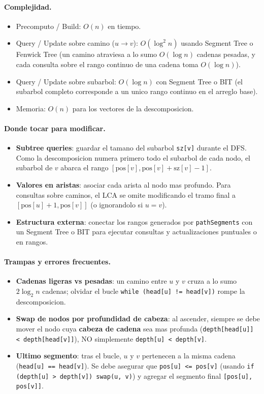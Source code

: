 \paragraph{Complejidad.}
\begin{itemize}\setlength\itemsep{0pt}
	\item Precomputo / Build: $O(n)$ en tiempo.
	\item Query / Update sobre camino ($u \to v$): $O(\log^2 n)$ usando Segment Tree o Fenwick Tree (un camino atraviesa a lo sumo $O(\log n)$ cadenas pesadas, y cada consulta sobre el rango continuo de una cadena toma $O(\log n)$).
	\item Query / Update sobre subarbol: $O(\log n)$ con Segment Tree o BIT (el subarbol completo corresponde a un unico rango continuo en el arreglo base).
	\item Memoria: $O(n)$ para los vectores de la descomposicion.
\end{itemize}

\paragraph{Donde tocar para modificar.}
\begin{itemize}\setlength\itemsep{0pt}
	\item \textbf{Subtree queries}: guardar el tamano del subarbol \verb|sz[v]| durante el DFS. Como la descomposicion numera primero todo el subarbol de cada nodo, el subarbol de $v$ abarca el rango $[\text{pos}[v], \text{pos}[v] + \text{sz}[v] - 1]$.
	\item \textbf{Valores en aristas}: asociar cada arista al nodo mas profundo. Para consultas sobre caminos, el LCA se omite modificando el tramo final a $[\text{pos}[u] + 1, \text{pos}[v]]$ (o ignorandolo si $u = v$).
	\item \textbf{Estructura externa}: conectar los rangos generados por \verb|pathSegments| con un Segment Tree o BIT para ejecutar consultas y actualizaciones puntuales o en rangos.
\end{itemize}

\paragraph{Trampas y errores frecuentes.}
\begin{itemize}\setlength\itemsep{0pt}
	\item \textbf{Cadenas ligeras vs pesadas}: un camino entre $u$ y $v$ cruza a lo sumo $2 \log_2 n$ cadenas; olvidar el bucle \verb|while (head[u] != head[v])| rompe la descomposicion.
	\item \textbf{Swap de nodos por profundidad de cabeza}: al ascender, siempre se debe mover el nodo cuya \textbf{cabeza de cadena} sea mas profunda (\verb|depth[head[u]] < depth[head[v]]|), NO simplemente \verb|depth[u] < depth[v]|.
	\item \textbf{Ultimo segmento}: tras el bucle, $u$ y $v$ pertenecen a la misma cadena (\verb|head[u] == head[v]|). Se debe asegurar que \verb|pos[u] <= pos[v]| (usando \verb|if (depth[u] > depth[v]) swap(u, v)|) y agregar el segmento final \verb|[pos[u], pos[v]]|.
\end{itemize}

